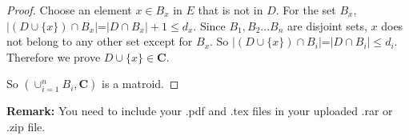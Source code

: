 \documentclass[12pt,a4paper]{article}
\theoremstyle{definition}
\begin{document}
\begin{enumerate}
\begin{enumerate}
\begin{proof}
        Choose an element $x\in B_x$ in $E$ that is not in $D$. For the set $B_x$, $|(D\cup\{x\})\cap B_x|$=$|D\cap B_x|+1\le d_x$. Since $B_1,B_2 ... B_n$ are disjoint sets, $x$ does not belong to any other set except for $B_x$. So $|(D\cup\{x\})\cap B_i|$=$|D\cap B_i|\le d_i$. Therefore we prove $D\cup \{x\} \in \mathbf{C}$.
        
        So $(\cup^{n}_{i=1} B_i,\mathbf{C})$ is a matroid.
    \end{proof}


\end{enumerate}
  

    

\end{enumerate}

\vspace{20pt}

\textbf{Remark:} You need to include your .pdf and .tex files in your uploaded .rar or .zip file.

\end{document}
